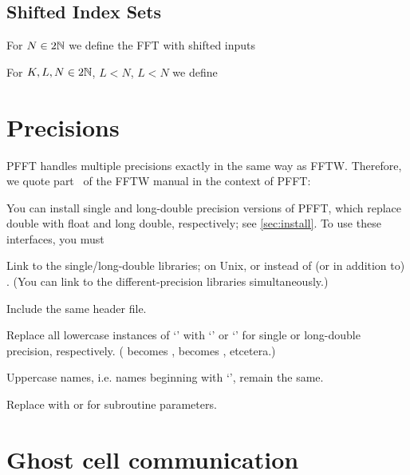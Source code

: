 \subsection{Shifted Index Sets}
For $N\in 2\mathbb{N}$ we define the FFT with shifted inputs


For $K,L,N\in 2\mathbb{N}$, $L<N$, $L<N$ we define





\section{Precisions}\label{sec:prec}
PFFT handles multiple precisions exactly in the same way as FFTW. Therefore, we quote part~\cite{fftw-prec} of the FFTW manual in the context of PFFT:

You can install single and long-double precision versions of PFFT, which replace double with float and long double, respectively; see \ref{sec:install}.
To use these interfaces, you must
\begin{compactitem}
  \item Link to the single/long-double libraries; on Unix,  or  instead of (or in addition to) .
        (You can link to the different-precision libraries simultaneously.)
  \item Include the same  header file.
  \item Replace all lowercase instances of ‘’ with ‘’ or ‘’ for single or long-double precision, respectively.
        ( becomes ,  becomes , etcetera.)
  \item Uppercase names, i.e. names beginning with ‘’, remain the same.
  \item Replace  with  or  for subroutine parameters.
\end{compactitem}

\section{Ghost cell communication}
